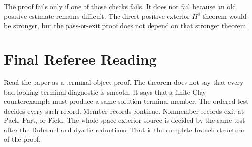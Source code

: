 The proof fails only if one of those checks fails.
It does not fail because an old positive estimate remains difficult.
The direct positive exterior \(H^s\) theorem would be stronger, but the pass-or-exit proof does not depend on that stronger theorem.

\section{Final Referee Reading}

Read the paper as a terminal-object proof.
The theorem does not say that every bad-looking terminal diagnostic is smooth.
It says that a finite Clay counterexample must produce a same-solution terminal member.
The ordered test decides every such record.
Member records continue.
Nonmember records exit at Pack, Part, or Field.
The whole-space exterior source is decided by the same test after the Duhamel and dyadic reductions.
That is the complete branch structure of the proof.
